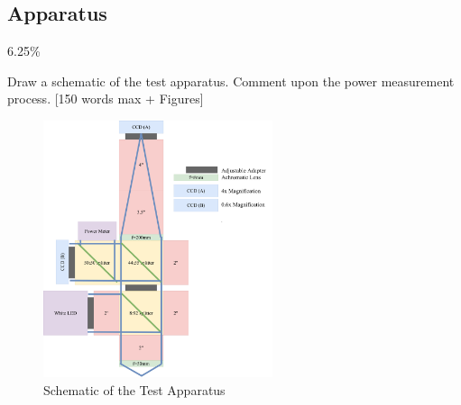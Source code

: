 \subsection{Apparatus}
\label{sec:test:apparatus}

{6.25\%

Draw a schematic of the test apparatus. Comment upon the power measurement process. [150 words max + Figures]}

\begin{figure}
  \centering
  \includegraphics[width=0.6\textwidth]{Figures/angus_bruce/apparatus_microandnano1.pdf}
  \caption{Schematic of the Test Apparatus}
  \label{fig:apparatus}
\end{figure}
